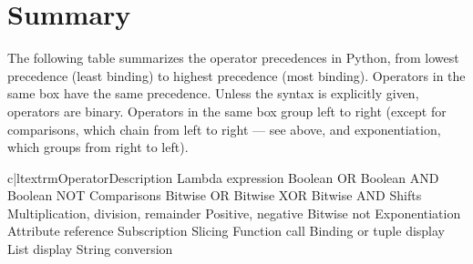 \section{Summary\label{summary}}

The following table summarizes the operator
precedences in Python, from lowest
precedence (least binding) to highest precedence (most binding).
Operators in the same box have the same precedence.  Unless the syntax
is explicitly given, operators are binary.  Operators in the same box
group left to right (except for comparisons, which chain from left to
right --- see above, and exponentiation, which groups from right to
left).

\begin{tableii}{c|l}{textrm}{Operator}{Description}
    			{Lambda expression}
  \hline
    			{Boolean OR}
  \hline
    			{Boolean AND}
  \hline
    		{Boolean NOT}
  \hline
    \lineii{\code{<}, \code{<=}, \code{>}, \code{>=},
            \code{<>}, \code{!=}, \code{==}}
	   {Comparisons}
  \hline
    \lineii{\code{|}}				{Bitwise OR}
  \hline
    \lineii{\code{\^}}				{Bitwise XOR}
  \hline
    \lineii{\code{\&}}				{Bitwise AND}
  \hline
    \lineii{\code{<}\code{<}, \code{>}\code{>}}	{Shifts}
  \hline
  \hline
    \lineii{\code{*}, \code{/}, \code{\%}}
           {Multiplication, division, remainder}
  \hline
    	{Positive, negative}
    			{Bitwise not}
  \hline
    \lineii{\code{**}}				{Exponentiation}
  \hline
    	{Attribute reference}
    	{Subscription}
    	{Slicing}
    	{Function call}
  \hline
    	{Binding or tuple display}
    	{List display}
    	{String conversion}
\end{tableii}
